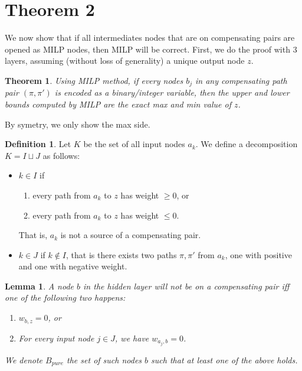 \documentclass[]{article}
\newtheorem{theorem}{Theorem}
\newtheorem{lemma}{Lemma}
\theoremstyle{definition}
\newtheorem{definition}{Definition}
\begin{document}
\section{Theorem 2}

We now show that if all intermediates nodes that are on compensating pairs are opened as MILP nodes, then MILP will be correct. First, we do the proof with 3 layers, assuming (without loss of generality) a unique output node $z$.

\begin{theorem}
	\label{no_diamond_2}
	Using MILP method, if every nodes $b_j$ in any compensating path pair
	 $(\pi,\pi')$ is encoded as a binary/integer variable, then the upper and lower 
	 bounds computed by MILP are the exact max and min value of $z$.
\end{theorem}

By symetry, we only show the max side. 



\begin{definition}
	Let $K$ be the set of all input nodes $a_k$. 
	We define a decomposition $K=I\sqcup J$ as follows:  
	\begin{itemize}
 \item $k \in I$  if
 \begin{enumerate}
	 \item every path from $a_k$ to $z$ has weight $\geq 0$, or
	\item every path from $a_k$ to $z$ has weight $\leq 0$.
 \end{enumerate}
That is, $a_k$ is not a source of a compensating pair.
	\item $k \in J$ if $k \notin I$, that is there exists two paths $\pi,\pi'$ from $a_k$, 
	one with positive and one with negative weight.
\end{itemize}
\end{definition} 


\begin{lemma} \label{lem:open_node}
	A node $b$ in the hidden layer will not be on a compensating pair iff one of the following two happens:
	\begin{enumerate}
	 \item $w_{b,z}=0$, or
	 \item For every input node $j\in J$, we have $w_{a_j,b}=0$.
	\end{enumerate}
	We denote $B_{pure}$ the set of such nodes $b$ such that at least one of the above holds.
\end{lemma}
\end{document}
